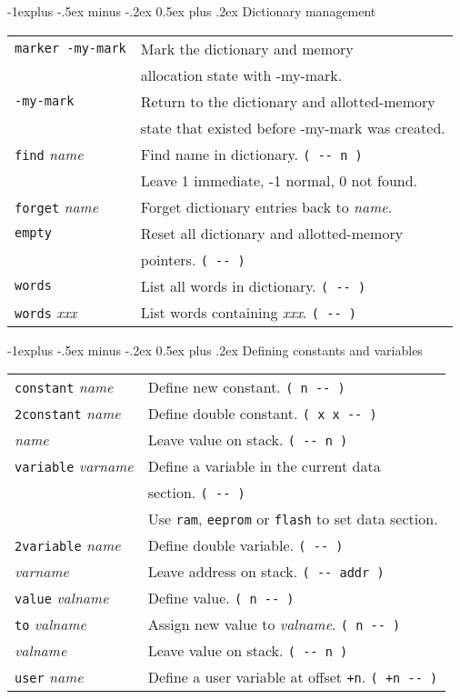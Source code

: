 \documentclass[10pt,landscape,a4paper]{article}
\makeatletter
\renewcommand{\subsection}{\@startsection{subsection}{2}{0mm}%
                                {-1explus -.5ex minus -.2ex}%
                                {0.5ex plus .2ex}%
                                {\normalfont\normalsize\bfseries}}
\makeatother
\begin{document}
\begin{multicols}{3}
\subsection{Dictionary management}
\begin{tabular}{@{}ll@{}}
\verb!marker -my-mark!  & Mark the dictionary and memory\\
                        & allocation state with -my-mark. \\
\verb!-my-mark!  & Return to the dictionary and allotted-memory \\
                 & state that existed before -my-mark was created. \\
\verb!find! \textit{name}  & Find name in dictionary. \verb!( -- n )! \\
    & Leave 1 immediate, -1 normal, 0 not found. \\
\verb!forget! \textit{name}  & Forget dictionary entries back to \textit{name}. \\
\verb!empty!  & Reset all dictionary and allotted-memory\\
              & pointers. \verb!( -- )! \\
\verb!words!  & List all words in dictionary. \verb!( -- )! \\
\verb!words! \textit{xxx} & List words containing \textit{xxx}. \verb!( -- )! \\
\end{tabular}

\medskip

\subsection{Defining constants and variables}
\begin{tabular}{@{}ll@{}}
\verb!constant! \textit{name}  & Define new constant. \verb!( n -- )! \\ 
\verb!2constant! \textit{name}  & Define double constant. \verb!( x x -- )! \\
\textit{name} & Leave value on stack. \verb!( -- n )! \\
\verb!variable! \textit{varname}  & Define a variable in the current data \\
                                  & section. \verb!( -- )! \\
                                  & Use \verb!ram!, \verb!eeprom! or \verb!flash! to set data section. \\
\verb!2variable! \textit{name}  & Define double variable. \verb!( -- )! \\
\textit{varname}  & Leave address on stack.  \verb!( -- addr )! \\
\verb!value! \textit{valname}  & Define value. \verb!( n -- )! \\
\verb!to! \textit{valname}  & Assign new value to \textit{valname}. \verb!( n -- )! \\
\textit{valname}  & Leave value on stack.  \verb!( -- n )! \\
\verb!user! \textit{name} & Define a user variable at offset \verb!+n!. \verb!( +n -- )! \\
\end{tabular}


\end{multicols}
\end{document}
